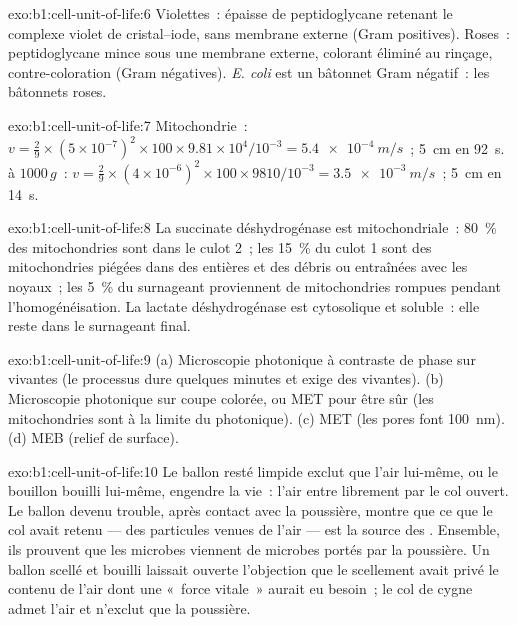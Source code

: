 \begin{solution}{exo:b1:cell-unit-of-life:6}
Violettes~:  épaisse de peptidoglycane retenant le complexe violet
de cristal--iode, sans membrane externe (Gram positives). Roses~:
peptidoglycane mince sous une membrane externe, colorant éliminé au
rinçage, contre-coloration (Gram négatives). \emph{E. coli} est un
bâtonnet Gram négatif~: les bâtonnets roses.
\end{solution}

\begin{solution}{exo:b1:cell-unit-of-life:7}
Mitochondrie~: $v = \frac{2}{9}\times(5\times 10^{-7})^2\times 100\times
9.81\times 10^4/10^{-3} = \qty{5.4e-4}{m/s}$~; \qty{5}{cm} en
\qty{92}{s}.  à $1000\,g$~: $v = \frac{2}{9}\times(4\times
10^{-6})^2\times 100\times 9810/10^{-3} = \qty{3.5e-3}{m/s}$~;
\qty{5}{cm} en \qty{14}{s}.
\end{solution}

\begin{solution}{exo:b1:cell-unit-of-life:8}
La succinate déshydrogénase est mitochondriale~: \qty{80}{\%} des
mitochondries sont dans le culot 2~; les \qty{15}{\%} du culot 1 sont
des mitochondries piégées dans des  entières et des débris ou
entraînées avec les noyaux~; les \qty{5}{\%} du surnageant proviennent
de mitochondries rompues pendant l'homogénéisation. La lactate
déshydrogénase est cytosolique et soluble~: elle reste dans le
surnageant final.
\end{solution}

\begin{solution}{exo:b1:cell-unit-of-life:9}
(a) Microscopie photonique à contraste de phase sur  vivantes
(le processus dure quelques minutes et exige des  vivantes).
(b) Microscopie photonique sur coupe colorée, ou MET pour être sûr (les
mitochondries sont à la limite du photonique). (c) MET (les pores font
\qty{100}{nm}). (d) MEB (relief de surface).
\end{solution}

\begin{solution}{exo:b1:cell-unit-of-life:10}
Le ballon resté limpide exclut que l'air lui-même, ou le bouillon
bouilli lui-même, engendre la vie~: l'air entre librement par le col
ouvert. Le ballon devenu trouble, après contact avec la poussière,
montre que ce que le col avait retenu --- des particules venues de
l'air --- est la source des . Ensemble, ils prouvent que les
microbes viennent de microbes portés par la poussière. Un ballon
scellé et bouilli laissait ouverte l'objection que le scellement avait
privé le contenu de l'air dont une «~force vitale~» aurait eu besoin~;
le col de cygne admet l'air et n'exclut que la poussière.
\end{solution}

